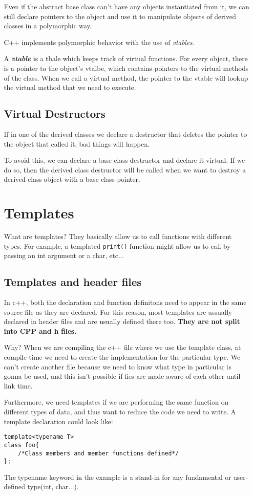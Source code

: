 \documentclass{article}
\begin{document}
Even if the abstract base class can't have any objects instantiated from it, we can still declare pointers to 
the object and use it to manipulate objects of derived classes in a polymorphic way.

C++ implements polymorphic behavior with the use of \textit{vtables}.

A \textbf{\textit{vtable}} is a tbale which keeps track of virtual functions. For every object, there is a pointer
to  the object's vtalbe, which contains pointers to the virtual methods of the class. When we call a virtual 
method, the pointer to the vtable will lookup the virtual method that we need to execute. 
\subsection{Virtual Destructors}
If in one of the derived classes we declare a destructor that deletes the pointer to the object that called
it, bad things will happen.

To avoid this, we can declare a base class destructor and declare it virtual. If we do so, then the derived
class destructor will be called when we want to destroy a derived class object with a base class pointer.
\newpage
\section{Templates}
What are templates? They basically allow us to call functions with different types. For example, a templated
\texttt{print()} function might allow us to call by passing an int argument or a char, etc...
\subsection{Templates and header files}

In c++, both the declaration and function definitons need to appear in the same source file as they are declared.
For this reason, most templates are ussually declared in header files and are usually defined there too. 
\textbf{They are not split into CPP and h files.}

Why? When we are compiling the c++ file where we use the template class, at compile-time we need to create 
the implementation for the particular type. We can't create another file because we need to know what type 
in particular is gonna be used, and this isn't possible if fies are made aware of each other until link time.

Furthermore, we need templates if we are performing the same function on different types of data, and thus
want to reduce the code we need to write. A template declaration could look like: 
\begin{verbatim}
template<typename T>
class foo{
	/*Class members and member functions defined*/
};
\end{verbatim}
The typename keyword in the example is a stand-in for any fundamental or user-defined type(int, char...).
\end{document}
